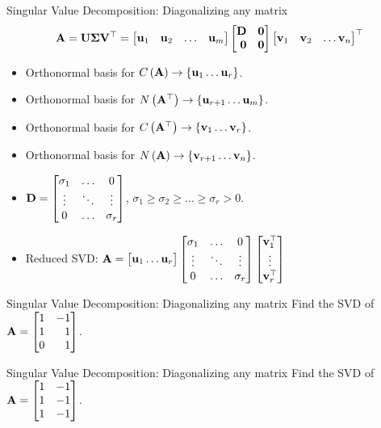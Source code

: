\documentclass[aspectratio=169]{beamer}
\def\mf{\ensuremath\mathbf}
\def\lp{\ensuremath\left(}
\def\rp{\ensuremath\right)}
\def\lc{\ensuremath\left\{}
\def\rc{\ensuremath\right\}}
\def\bmx{\ensuremath\begin{bmatrix*}[r]}
\def\emx{\ensuremath\end{bmatrix*}}
\def\bmxc{\ensuremath\begin{bmatrix*}[c]}
\begin{document}
\begin{frame}[t]{Singular Value Decomposition: Diagonalizing any matrix}
\[ \mf{A} = \mf{U}\mf{\Sigma}\mf{V}^\top = \bmx \mf{u}_1 & \mf{u}_2 & \ldots & \mf{u}_m\emx \bmx \mf{D} & \mf{0}\\ \mf{0} & \mf{0} \emx \bmx \mf{v}_1 & \mf{v}_2 & \ldots \mf{v}_n \emx^\top\]

\begin{itemize}
    \item Orthonormal basis for $C\lp\mf{A}\rp \rightarrow \lc\mf{u}_{1}\ldots\mf{u}_{r}\rc$.
    
    \item Orthonormal basis for $N\lp\mf{A}^\top\rp \rightarrow \lc\mf{u}_{r+1}\ldots\mf{u}_{m}\rc$.
    
    \item Orthonormal basis for $C\lp\mf{A}^\top\rp \rightarrow \lc\mf{v}_{1}\ldots\mf{v}_{r}\rc$.
    \item Orthonormal basis for $N\lp\mf{A}\rp \rightarrow \lc\mf{v}_{r+1}\ldots\mf{v}_{n}\rc$.
    
    \item $\mf{D} = \bmxc \sigma_{1} & \ldots & 0\\\vdots & \ddots & \vdots\\0 & \ldots & \sigma_r\emx$, $\sigma_1 \geq \sigma_2 \geq \ldots \geq \sigma_r > 0$.

    \item Reduced SVD: $\mf{A} = \bmxc\mf{u}_1 \ldots \mf{u}_r\emx \bmxc \sigma_{1} & \ldots & 0\\\vdots & \ddots & \vdots\\0 & \ldots & \sigma_r\emx \bmxc\mf{v}_1^\top\\\vdots\\\mf{v}_r^\top\emx $
\end{itemize}
\end{frame}


\begin{frame}[t]{Singular Value Decomposition: Diagonalizing any matrix}
Find the SVD of $ \mf{A} = \bmx 1 & -1 \\ 1 & 1 \\ 0 & 1 \emx$.
\end{frame}


\begin{frame}[t]{Singular Value Decomposition: Diagonalizing any matrix}
Find the SVD of $ \mf{A} = \bmx 1 & -1 \\ 1 & -1 \\ 1 & -1 \emx$.
\end{frame}
\end{document}
